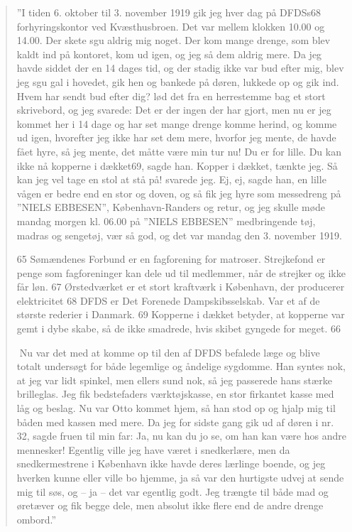 \begin{quote}
''I tiden 6. oktober
til 3. november 1919 gik jeg hver dag på DFDSs68 forhyringskontor ved
Kvæsthusbroen. Det var mellem klokken 10.00 og 14.00. Der skete sgu
aldrig mig noget. Der kom mange drenge, som blev kaldt ind på kontoret,
kom ud igen, og jeg så dem aldrig mere. Da jeg havde siddet der en 14
dages tid, og der stadig ikke var bud efter mig, blev jeg sgu gal i
hovedet, gik hen og bankede på døren, lukkede op og gik ind. Hvem har
sendt bud efter dig? lød det fra en herrestemme bag et stort skrivebord,
og jeg svarede: Det er der ingen der har gjort, men nu er jeg kommet her
i 14 dage og har set mange drenge komme herind, og komme ud igen,
hvorefter jeg ikke har set dem mere, hvorfor jeg mente, de havde fået
hyre, så jeg mente, det måtte være min tur nu! Du er for lille. Du kan
ikke nå kopperne i dækket69, sagde han. Kopper i dækket, tænkte jeg. Så
kan jeg vel tage en stol at stå på! svarede jeg. Ej, ej, sagde han, en
lille vågen er bedre end en stor og doven, og så fik jeg hyre som
messedreng på ''NIELS EBBESEN'', København-Randers og retur, og jeg
skulle møde mandag morgen kl. 06.00 på ''NIELS EBBESEN'' medbringende
tøj, madras og sengetøj, vær så god, og det var mandag den 3. november
1919.

65
Sømændenes Forbund er en fagforening for matroser. Strejkefond er penge
som fagforeninger kan dele ud til medlemmer, når de strejker og ikke får
løn. 67 Ørstedværket er et stort kraftværk i København, der producerer
elektricitet 68 DFDS er Det Forenede Dampskibsselskab. Var et af de
største rederier i Danmark. 69 Kopperne i dækket betyder, at kopperne
var gemt i dybe skabe, så de ikke smadrede, hvis skibet gyngede for
meget. 66

Nu var det med at komme op til den af DFDS befalede læge og blive
totalt undersøgt for både legemlige og åndelige sygdomme. Han syntes
nok, at jeg var lidt spinkel, men ellers sund nok, så jeg passerede hans
stærke brilleglas. Jeg fik bedstefaders værktøjskasse, en stor firkantet
kasse med låg og beslag. Nu var Otto kommet hjem, så han stod op og
hjalp mig til båden med kassen med mere. Da jeg for sidste gang gik ud
af døren i nr. 32, sagde fruen til min far: Ja, nu kan du jo se, om han
kan være hos andre mennesker! Egentlig ville jeg have været i
snedkerlære, men da snedkermestrene i København ikke havde deres
lærlinge boende, og jeg hverken kunne eller ville bo hjemme, ja så var
den hurtigste udvej at sende mig til søs, og -- ja -- det var egentlig
godt. Jeg trængte til både mad og øretæver og fik begge dele, men
absolut ikke flere end de andre drenge ombord.''
\end{quote}

